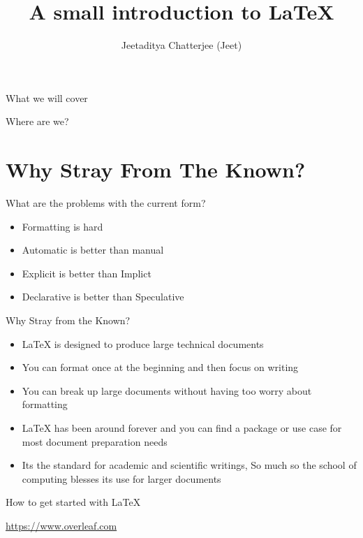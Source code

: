 \documentclass[notes]{beamer}
\title{A small introduction to \LaTeX{}}
\subtitle{}
\author{Jeetaditya Chatterjee (Jeet)}
\institute{UoP IT Society}
\date{}
\begin{document}
\begin{frame}
	\titlepage{}
\end{frame}
\begin{frame}{What we will cover}
	\tableofcontents
\end{frame}
\AtBeginSection
{
	\begin{frame}{Where are we?}
		\tableofcontents[currentsection]
	\end{frame}
}

\section{Why Stray From The Known?}%
\label{sec:whystray}
\begin{frame}{What are the problems with the current form?}
	\begin{itemize}
		\item Formatting is hard
		\item Automatic is better than manual
		\item Explicit is better than Implict
		\item Declarative is better than Speculative
	\end{itemize}
\end{frame}

\begin{frame}{Why Stray from the Known?}
	\begin{itemize}
		\item \LaTeX{} is designed to produce large technical documents
		\item You can format once at the beginning and then focus on writing
		\item You can break up large documents without having too worry about
		      formatting
		\item \LaTeX{} has been around forever and you can find a package or
		      use case for most document preparation needs
		\item Its the standard for academic and scientific writings, So much
		      so the school of computing blesses its use for larger documents
	\end{itemize}
\end{frame}

\begin{frame}{How to get started with LaTeX}
	\begin{center}
		\url{https://www.overleaf.com}
	\end{center}
\end{frame}
\end{document}
